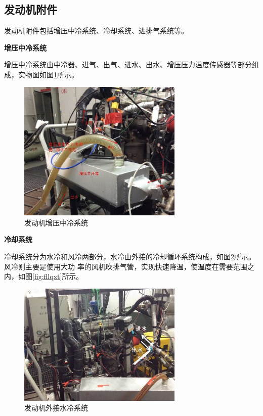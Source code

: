 \subsection{发动机附件}
发动机附件包括增压中冷系统、冷却系统、进排气系统等。
\par \textbf{增压中冷系统}
\par 增压中冷系统由中冷器、进气、出气、进水、出水、增压压力温度传感器等部分组成，实物图如图\ref{fig:zyzlq}所示。
\begin{figure}[H]
	\centering
	\includegraphics[width=0.7\textwidth]{thesis_figure/platformer_chapter/zyzlq}
	\caption{发动机增压中冷系统}
	\label{fig:zyzlq}
\end{figure}
\par \textbf{冷却系统}
\par 冷却系统分为水冷和风冷两部分，水冷由外接的冷却循环系统构成，如图\ref{fig:sllqxt}所示。风冷则主要是使用大功
率的风机吹排气管，实现快速降温，使温度在需要范围之内，如图\ref{fig:fllqxt}所示。
\begin{figure}[H]
	\centering
	\includegraphics[width=0.7\textwidth]{thesis_figure/platformer_chapter/sllqxt}
	\caption{发动机外接水冷系统}
	\label{fig:sllqxt}
\end{figure}
